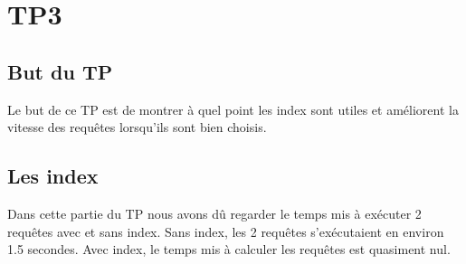 \documentclass{article}
\begin{document}
\section{TP3}
\subsection{But du TP}
Le but de ce TP est de montrer \`a quel point les index sont utiles et am\'eliorent la vitesse des requ\^etes lorsqu'ils sont bien choisis.
\subsection{Les index}
Dans cette partie du TP nous avons d\^u regarder le temps mis \`a ex\'ecuter 2 requ\^etes avec et sans index. Sans index, les 2 requ\^etes s'ex\'ecutaient en environ 1.5 secondes. Avec index, le temps mis \`a calculer les requ\^etes est quasiment nul.
\end{document}
